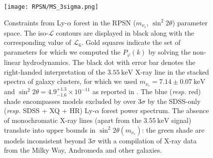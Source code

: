 \begin{figure}[!]
\begin{center}
\texttt{[image: RPSN/MS\_3sigma.png]}
\caption{Constraints from Ly-$\alpha$ forest in the RPSN ($m_{\nu_s}$,
  $\sin^2 2 \theta$) parameter space. The iso-$\mathcal{L}$ contours are displayed in black along with the corresponding value of $\mathcal{L}_6$. Gold squares indicate the set of parameters for which we computed the $P_\varphi (k)$ by solving the non-linear hydrodynamics. The black dot with error bar denotes the right-handed interpretation of the $3.55 ~\mathrm{keV}$ X-ray line in the stacked spectra of galaxy clusters, for which we used  $m_{\nu_s} = 7.14 \pm 0.07 ~\mathrm{keV}$ and $\sin^2 2 \theta = 4.9^{+ 1.3}_{-1.6} \times 10^{-11}$ as reported in \cite{Boyarsky14}. The blue (\textit{resp.} red) shade encompasses  models excluded by over $3\sigma$ by the SDSS-only (\textit{resp.} SDSS + XQ + HR) Ly-$\alpha$ forest  power spectrum. The absence of monochromatic X-ray lines (apart from the  $3.55~\mathrm{keV}$ signal) translate into upper bounds in $\sin^2 2 \theta (m_{\nu_s})$: the green shade are models inconsistent beyond $3\sigma$ with a compilation of X-ray data from the Milky Way, Andromeda and other galaxies.}
\label{fig:RPSN_MT}
\end{center}
\end{figure}



